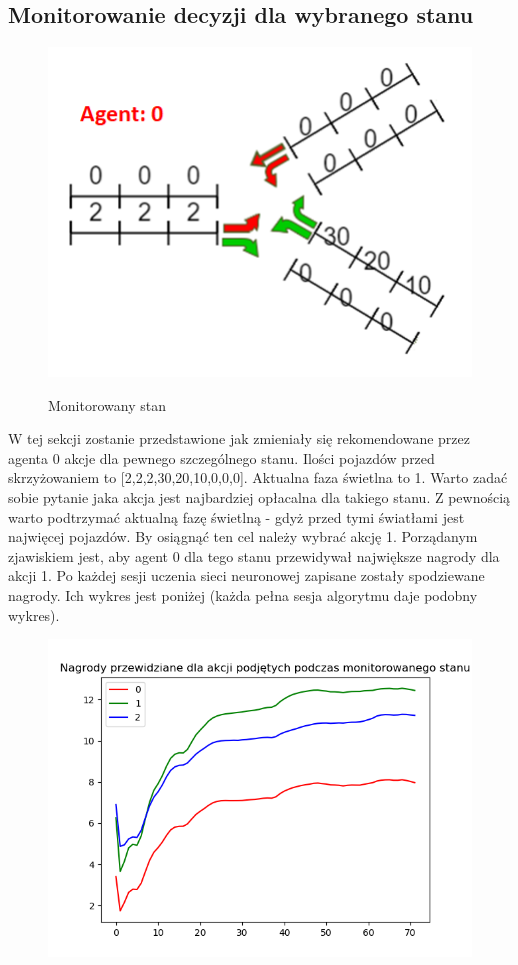 \documentclass[12pt]{book}
\theoremstyle{plain}
\begin{document}
	\subsection{Monitorowanie decyzji dla wybranego stanu}\label{subsec:env_4_monitorowanie_stanu}
\begin{figure}[h]
	\centering
	\includegraphics[width=12cm]{monitorowany_stan}
	\label{fig:monitorowany_stan}
	\caption{Monitorowany stan}
\end{figure}
W tej sekcji zostanie przedstawione jak zmieniały się rekomendowane przez agenta 0 akcje dla pewnego szczególnego stanu. Ilości pojazdów przed skrzyżowaniem to [2,2,2,30,20,10,0,0,0]. Aktualna faza świetlna to 1. Warto zadać sobie pytanie jaka akcja jest najbardziej opłacalna dla takiego stanu. Z pewnością warto podtrzymać aktualną fazę świetlną - gdyż przed tymi światłami jest najwięcej pojazdów. By osiągnąć ten cel należy wybrać akcję 1. Porządanym zjawiskiem jest, aby agent 0 dla tego stanu przewidywał największe nagrody dla akcji 1. Po każdej sesji uczenia sieci neuronowej zapisane zostały spodziewane nagrody. Ich wykres jest poniżej (każda pełna sesja algorytmu daje podobny wykres).
	\begin{figure}[H]
		\centering
		\includegraphics[width=14cm]{env_4_monitorowany_stan_wykres}
		\label{fig:env_4_monitorowany_stan_wykres}
	\end{figure}
	
\end{document}
